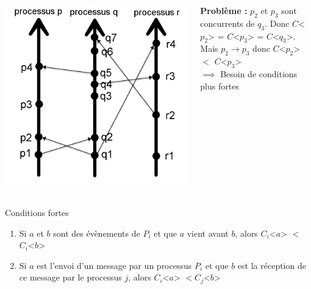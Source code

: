 \documentclass[compress]{beamer}
\begin{document}
\begin{frame}

\begin{columns}
    \begin{column}{.35\textwidth}
		\includegraphics[scale=0.15]{process2.png}
    \end{column}
	\begin{column}{0.65 \textwidth}
\textbf{{\color{red}Problème : }}$p_2$ et $p_3$ sont concurrents de $q_3$. Donc $C$<$p_2$> = $C$<$p_3$> = $C$<$q_3$>. \\
Mais $p_2 \rightarrow p_3$ donc $C$<$p_2$> $<$ $C$<$p_3$>\\ \bigskip
$\implies$ Besoin de conditions plus fortes
	\end{column}
	\end{columns}
\begin{block}{Conditions fortes}
\begin{enumerate}
\item Si $a$ et $b$ sont des évènements de $P_i$ et que $a$ vient avant $b$, alors $C_i$<$a$> $<$ $C_i$<$b$>
\item Si $a$ est l'envoi d'un message par un processus $P_i$ et que $b$ est la réception de ce message par le processus $j$, alors $C_i$<$a$> $< C_j$<$b$>
\end{enumerate}
\end{block}
\end{frame}
\end{document}
